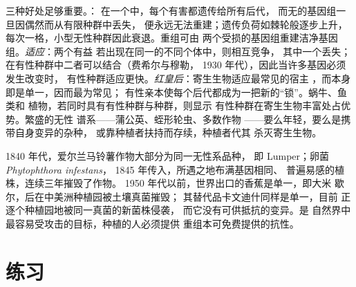 \begin{proposition}[有性生殖的作用]\label{prop:b2:asexual-reproduction:whysex}
三种好处足够重要。\emph{}：
在一个中，每个有害都遗传给所有后代，
而无的基因组一旦因偶然而从有限种群中丢失，
便永远无法重建；遗传负荷如棘轮般逐步上升，
每次一格，小型无性种群因此衰退。重组可由
两个受损的基因组重建洁净基因组。\emph{适应}：两个有益
若出现在同一的不同个体中，则相互竞争，
其中一个丢失；在有性种群中二者可以结合（费希尔与穆勒，
1930 年代），因此当许多基因必须发生改变时，
有性种群适应更快。\emph{红皇后}：寄生生物适应最常见的宿主
，而本身即是单一，因而最为常见；
有性亲本使每个后代都成为一把新的“锁”。蜗牛、鱼类和
植物，若同时具有有性种群与种群，则显示
有性种群在寄生生物丰富处占优势。繁盛的无性
谱系——蒲公英、蛭形轮虫、多数作物
——要么年轻，要么是携带自身变异的杂种，
或靠种植者扶持而存续，种植者代其
杀灭寄生生物。
\end{proposition}

\begin{example}[同一克隆的单一栽培]\label{ex:b2:asexual-reproduction:monoculture}
1840 年代，爱尔兰马铃薯作物大部分为同一无性系品种，
即 Lumper；卵菌 \emph{Phytophthora infestans}，
1845 年传入，所遇之地布满基因相同、
普遍易感的植株，连续三年摧毁了作物。
1950 年代以前，世界出口的香蕉是单一，即大米
歇尔，后在中美洲种植园被土壤真菌摧毁；
其替代品卡文迪什同样是单一，目前
正逐个种植园地被同一真菌的新菌株侵袭，
而它没有可供抵抗的变异。是
自然界中最容易受攻击的目标，种植的人必须提供
重组本可免费提供的抗性。
\end{example}

\section{练习}

